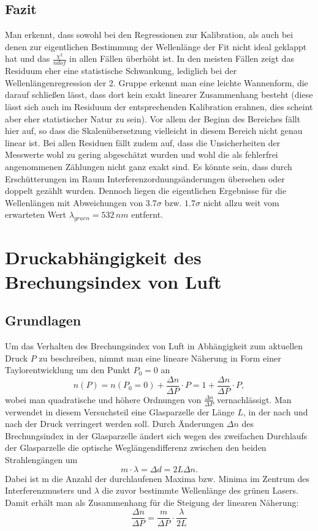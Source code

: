 \documentclass[a4paper, 11pt]{article}
\begin{document}
\subsection{Fazit}
Man erkennt, dass sowohl bei den Regressionen zur Kalibration, als auch bei denen zur eigentlichen Bestimmung der Wellenlänge der Fit nicht ideal geklappt hat und das $\frac{\chi^2}{ndof}$ in allen Fällen überhöht ist. In den meisten Fällen zeigt das Residuum eher eine statistische Schwankung, lediglich bei der Wellenlängenregression der 2. Gruppe erkennt man eine leichte Wannenform, die darauf schließen lässt, dass dort kein exakt linearer Zusammenhang besteht (diese lässt sich auch im Residuum der entsprechenden Kalibration erahnen, dies scheint aber eher statistischer Natur zu sein). Vor allem der Beginn des Bereiches fällt hier auf, so dass die Skalenübersetzung vielleicht in diesem Bereich nicht genau linear ist. \newline
Bei allen Residuen fällt zudem auf, dass die Unsicherheiten der Messwerte wohl zu gering abgeschätzt wurden und wohl die als fehlerfrei angenommenen Zählungen nicht ganz exakt sind. Es könnte sein, dass durch Erschütterungen im Raum Interferenzordnungsänderungen übersehen oder doppelt gezählt wurden. \newline
Dennoch liegen die eigentlichen Ergebnisse für die Wellenlängen mit Abweichungen von $3.7 \sigma$ bzw. $1.7 \sigma$ nicht allzu weit vom erwarteten Wert $\lambda_{gruen} = 532 \, nm$ entfernt.

\newpage
\section{Druckabhängigkeit des Brechungsindex von Luft}
\subsection{Grundlagen}
Um das Verhalten des Brechungsindex von Luft in Abhängigkeit zum aktuellen Druck $P$ zu beschreiben, nimmt man eine lineare Näherung in Form einer Taylorentwicklung um den Punkt $P_0 = 0$ an \[ n(P) = n ( P_0 = 0) + \frac{\Delta n}{\Delta P}\cdot P = 1 + \frac{\Delta n}{\Delta P} \cdot P, \] wobei man quadratische und höhere Ordnungen von $\frac{\Delta n}{\Delta P}$ vernachlässigt.
Man verwendet in diesem Versuchsteil eine Glasparzelle der Länge $L$, in der nach und nach der Druck verringert werden soll. Durch Änderungen $\Delta n$ des Brechungsindex in der Glasparzelle ändert sich wegen des zweifachen Durchlaufs der Glasparzelle die optische Weglängendifferenz zwischen den beiden Strahlengängen um  \[ m \cdot \lambda = \Delta d = 2L \Delta n. \]
Dabei ist m die Anzahl der durchlaufenen Maxima bzw. Minima im Zentrum des Interferenzmusters und $\lambda$ die zuvor bestimmte Wellenlänge des grünen Lasers. 
Damit erhält man als Zusammenhang für die Steigung der linearen Näherung: \[ \frac{\Delta n}{\Delta P} = \frac{m}{\Delta P} \cdot \frac{\lambda}{2L} \]
\end{document}
